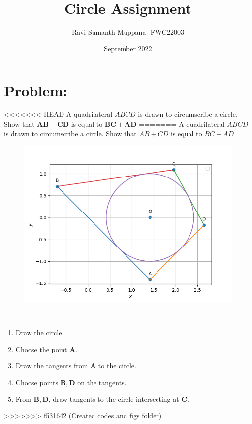 \documentclass[a4paper,12pt,twocolumn]{article}
\title{Circle Assignment}
\author{Ravi Sumanth Muppana- FWC22003}
\date{September 2022}
\let\vec\mathbf
\begin{document}
\maketitle
\section{Problem:}
<<<<<<< HEAD
A quadrilateral $ABCD$ is drawn to circumscribe a circle. Show that $\vec{AB+CD}$ is equal to $\vec{BC+AD}$
=======
\fi
A quadrilateral $ABCD$ is drawn to circumscribe a circle. Show that $AB+CD$ is equal to $BC+AD$
	\begin{figure}[!h]
		\centering
 \includegraphics[width=\columnwidth]{chapters/10/10/2/8/figs/circle.png}
		\caption{}
		\label{fig:10/10/2/8}
  	\end{figure}
	\\
	\solution 
	\begin{enumerate}
		\item  Draw the circle.
		\item Choose the point $\vec{A}$.
		\item Draw the tangents from $\vec{A}$ to the circle.
		\item Choose points $\vec{B}, \vec{D}$ on the tangents.
		\item From $\vec{B}, \vec{D}$, draw tangents to the circle intersecting at $\vec{C}$.
	\end{enumerate}
\iffalse
>>>>>>> f531642 (Created codes and figs folder)
\maketitle
\end{document}
